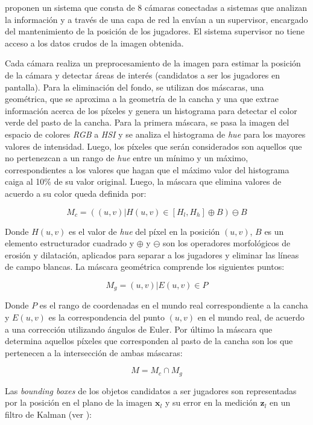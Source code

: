 \documentclass[a4paper,10pt]{article}
\begin{document}
\citeauthor*{xu-8cams} proponen un sistema que consta de 8 cámaras conectadas a
sistemas que analizan la información y a través de una capa de red la envían
a un supervisor, encargado del mantenimiento de la posición de los
jugadores. El sistema supervisor no tiene acceso a los datos crudos de la
imagen obtenida.

Cada cámara realiza un preprocesamiento de la imagen para estimar la posición
de la cámara y detectar áreas de interés (candidatos a ser los jugadores en
pantalla). Para la eliminación del fondo, se utilizan dos máscaras, una
geométrica, que se aproxima a la geometría de la cancha y una que extrae
información acerca de los píxeles y genera un histograma para detectar el color
verde del pasto de la cancha. Para la primera máscara, se pasa la imagen del
espacio de colores
\textit{RGB} a \textit{HSI} y se analiza el histograma de \textit{hue} para los
mayores valores de intensidad. Luego, los píxeles que serán considerados son
aquellos que no pertenezcan a un rango de \textit{hue} entre un mínimo y un
máximo, correspondientes a los valores que hagan que el máximo valor del
histograma caiga al 10\% de su valor original.  Luego, la máscara que elimina
valores de acuerdo a su color queda definida por:

\[
  M_c = ({(u, v) | H(u, v) \in [H_l, H_h]} \oplus B ) \ominus B
\]

Donde $H(u, v)$ es el valor de \textit{hue} del píxel en la posición $(u, v)$,
$B$ es un elemento estructurador cuadrado y $\oplus$ y $\ominus$ son los
operadores morfológicos de erosión y dilatación, aplicados para separar a los
jugadores y eliminar las líneas de campo blancas. La máscara geométrica
comprende los siguientes puntos:

\[
  M_g = { (u, v) | E(u, v)  \in P }
\]

Donde $P$ es el rango de coordenadas en el mundo real correspondiente a la cancha
y $E(u, v)$ es la correspondencia del punto $(u, v)$ en el mundo real, de
acuerdo a una corrección utilizando ángulos de Euler. Por último la máscara que
determina aquellos píxeles que corresponden al pasto de la cancha son los que
pertenecen a la intersección de ambas máscaras:

\[
  M = M_c \cap M_g
\]

Las \textit{bounding boxes} de los objetos candidatos a ser jugadores son
representadas por la posición en el plano de la imagen $\mathbf{x}_l$ y su
error en la medición $\mathbf{z}_l$ en un filtro de Kalman (ver \cite{funk2003study}):
\end{document}
